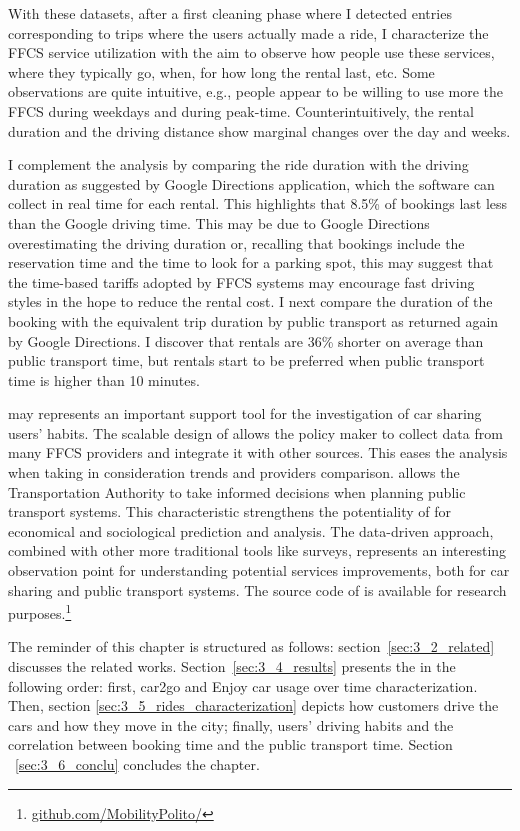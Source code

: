 With these datasets, after a first cleaning phase where I detected entries corresponding to trips where the users actually made a ride, I characterize the FFCS service utilization with the aim to observe how people use these services, where they typically go, when, for how long the rental last, etc. Some observations are quite intuitive, e.g., people appear to be willing to use more the FFCS during weekdays and during peak-time. Counterintuitively, the rental duration and the driving distance show marginal changes over the day and weeks.

I complement the analysis by comparing the ride duration with the driving duration as suggested by Google Directions application, which the software can collect in real time for each rental. This highlights that 8.5\% of bookings last less than the Google driving time. 
This may be due to Google Directions overestimating the driving duration or, recalling that bookings  include the reservation time and the time to look for a parking spot, this may suggest that the time-based tariffs adopted by FFCS systems may encourage fast driving styles in the hope to reduce the rental cost.
I next compare the duration of the booking with the equivalent trip duration by public transport as returned again by Google Directions. I discover that rentals are 36\% shorter on average than public transport time, but  rentals start to be preferred when public transport time is higher than 10 minutes.

\tool may represents an important support tool for the investigation of car sharing users' habits. The scalable design of \tool allows the policy maker to collect data from many FFCS providers  and integrate it with other sources. This eases the analysis when taking in consideration trends and providers comparison. \tool allows the Transportation Authority to take informed decisions when planning public transport systems. This characteristic strengthens the potentiality of \tool for economical and sociological prediction and analysis. The data-driven approach, combined with other more traditional tools like surveys, represents an interesting observation point for understanding potential services improvements, both for car sharing and public transport systems. The source code of \tool  is available for research purposes.\footnote{\url{github.com/MobilityPolito/}}

The reminder of this chapter is structured as follows: section~\ref{sec:3_2_related} discusses the related works. Section~\ref{sec:3_4_results} presents the in the following order: first, car2go and Enjoy car usage over time characterization. Then, section \ref{sec:3_5_rides_characterization} depicts how customers drive the cars and how they move in the city; finally, users' driving habits and the correlation between booking time and the public transport time. Section ~\ref{sec:3_6_conclu} concludes the chapter.

